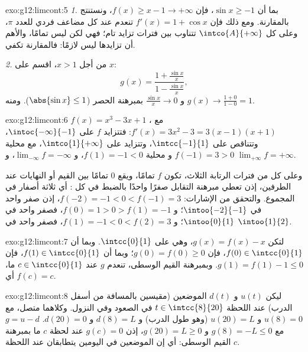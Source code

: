 \begin{solution}{exo:g12:limcont:5}
\emph{1.} بما أن $\sin x \geq -1$، فإن $f(x) \geq x - 1 \to +\infty$، ونستنتج
بالمقارنة. ومع ذلك فإن $f'(x) = 1 + \cos x$ تنعدم عند كل مضاعف
فردي للعدد $\pi$، وعلى كل  $\intco{A}{+\infty}$ تتناوب 
بين فترات تزايد تام؛ فهي  لكن ليس
تمامًا، والأهم أن تزايدها ليس لازمًا: فالمقارنة تكفي.

\emph{2.} من أجل $x > 1$، اقسم على $x$:
\[
g(x) = \frac{1 + \frac{\sin x}{x}}{1 - \frac{\sin x}{x}},
\]
و $\frac{\sin x}{x} \to 0$ بمبرهنة الحصر
($\abs{\sin x} \leq 1$). ومنه $g(x) \to \frac{1+0}{1-0} = 1$.
\end{solution}

\begin{solution}{exo:g12:limcont:6}
$f(x) = x^3 - 3x + 1$ ، مع $f'(x) = 3x^2 - 3 = 3(x-1)(x+1)$:
فتتزايد $f$ على $\intoc{-\infty}{-1}$، وتتناقص على $\intcc{-1}{1}$،
وتتزايد على $\intco{1}{+\infty}$، مع  محلية $f(-1) = 3 > 0$ و
 محلية $f(1) = -1 < 0$، و $\lim_{-\infty} f = -\infty$،
و $\lim_{+\infty} f = +\infty$.

وعلى كل  من فترات الرتابة الثلاث، تكون $f$  
تمامًا، ويقع $0$ تمامًا بين القيم أو النهايات عند الطرفين، إذن
تعطي مبرهنة التقابل صفرًا واحدًا بالضبط في كل : أي ثلاثة أصفار في المجموع.
والتحقق من الإشارات: $f(-2) = -1 < 0 < f(-1) = 3$، إذن صفر واحد في
$\intoo{-2}{-1}$؛ و $f(0) = 1 > 0 > f(1) = -1$، فصفر واحد في $\intoo{0}{1}$؛
و $f(1) = -1 < 0 < f(2) = 3$، فصفر واحد في $\intoo{1}{2}$.
\end{solution}

\begin{solution}{exo:g12:limcont:7}
لتكن $g(x) = f(x) - x$، وهي  على $\intcc{0}{1}$. وبما أن
$f(0) \in \intcc{0}{1}$، فإن $g(0) = f(0) \geq 0$؛ وبما أن $f(1) \in \intcc{0}{1}$،
فإن $g(1) = f(1) - 1 \leq 0$. وبمبرهنة القيم الوسطى، تنعدم $g$ عند
$c \in \intcc{0}{1}$ ما، أي $f(c) = c$.
\end{solution}

\begin{solution}{exo:g12:limcont:8}
ليكن $u(t)$ و $d(t)$ الموضعين (مقيسين بالمسافة من أسفل
الدرب) عند اللحظة $t \in \intcc{8}{20}$ في الصعود وفي
النزول. وكلاهما متصل، مع $u(8) = 0$ و $u(20) = L$ (وهو طول الدرب)
و $d(8) = L$ و $d(20) = 0$.  $g = u - d$  مع
$g(8) = -L \leq 0$ و $g(20) = L \geq 0$، إذن $g(c) = 0$ عند لحظة $c$ ما بمبرهنة
القيم الوسطى: أي إن الموضعين في اليومين يتطابقان عند اللحظة $c$.
\end{solution}

